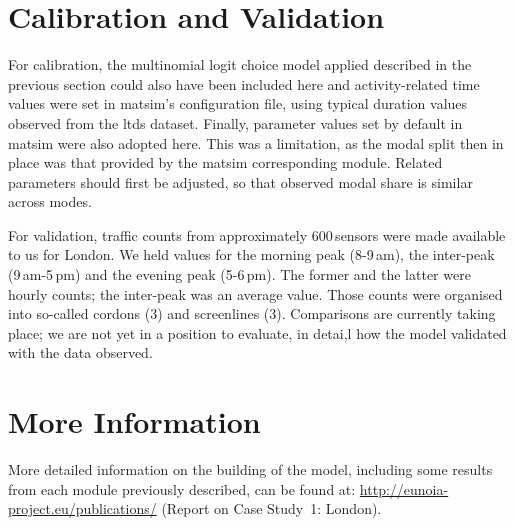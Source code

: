 \section{Calibration and Validation}
For calibration, the multinomial logit choice model applied described in the previous section could also have been included here and activity-related time values were set in \gls{matsim}’s configuration file, using typical duration values observed from the \gls{ltds} dataset. 
Finally, parameter values set by default in \gls{matsim} 
were also adopted here. This was a limitation, as the modal split then in place was that provided by the \gls{matsim} corresponding module. 
Related parameters should first be adjusted, so that observed modal share is similar across modes.

For validation, traffic counts from approximately 600\,sensors were made available to us for London. We held values for the morning peak (8-9\,am), the inter-peak (9\,am-5\,pm) and the evening peak (5-6\,pm). The former and the latter were hourly counts; the inter-peak was an average value. 
Those counts were organised into so-called cordons (3) and screenlines (3). Comparisons are currently taking place; we are not yet in a position to evaluate, in detai,l how the model validated with the data observed.

\section{More Information}
More detailed information on the building of the model, including some results from each module previously 
described, can be found at: \url{http://eunoia-project.eu/publications/} (Report on Case Study~1: London).

